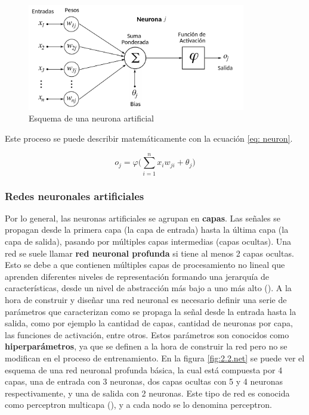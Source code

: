 \begin{figure}[h]
    \centering
    \includegraphics[width=0.85\textwidth]{figures/2.2.neuron.png}
    \caption{Esquema de una neurona artificial} 
    \label{fig:2.2.neuron}
\end{figure}

Este proceso se puede describir matemáticamente con la ecuación \eqref{eq: neuron}.

\begin{equation}
    o_j = \varphi \Big ( \sum \limits_{i=1}^{n}x_i w_{ji} + \theta_j \Big )
    \label{eq: neuron}
\end{equation}

\subsubsection{Redes neuronales artificiales}
Por lo general, las neuronas artificiales se agrupan en \textbf{capas}. Las señales se propagan desde la primera capa (la capa de entrada) hasta la última capa (la capa de salida), pasando por múltiples capas intermedias (capas ocultas). Una red se suele llamar \textbf{red neuronal profunda} si tiene al menos 2 capas ocultas. Esto se debe a que contienen múltiples capas de procesamiento no lineal que aprenden diferentes niveles de representación formando una jerarquía de características, desde un nivel de abstracción más bajo a uno más alto (\cite{chollet2021}). A la hora de construir y diseñar una red neuronal es necesario definir una serie de parámetros que caracterizan como se propaga la señal desde la entrada hasta la salida, como por ejemplo la cantidad de capas, cantidad de neuronas por capa, las funciones de activación, entre otros. Estos parámetros son conocidos como \textbf{hiperparámetros}, ya que se definen a la hora de construir la red pero no se modifican en el proceso de entrenamiento. En la figura \eqref{fig:2.2.net} se puede ver el esquema de una red neuronal profunda básica, la cual está compuesta por 4 capas, una de entrada con 3 neuronas, dos capas ocultas con 5 y 4 neuronas respectivamente, y una de salida con 2 neuronas. Este tipo de red es conocida como perceptron multicapa (\cite{hornik1991}), y a cada nodo se lo denomina perceptron. 



